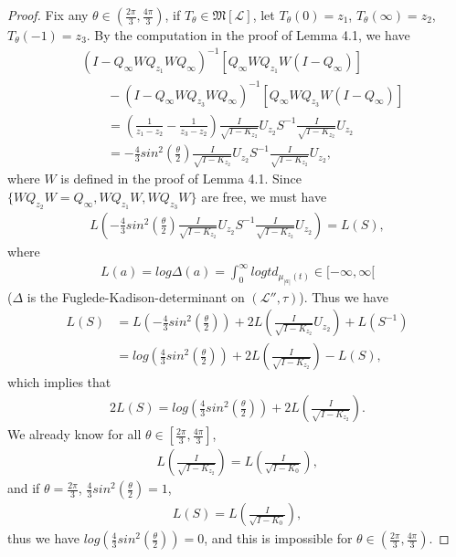 \documentclass{amsart}
\newcommand{\LLL}{\mathcal L} %
\newcommand{\MMM}{\mathfrak M}
\begin{document}
\begin{proof}
Fix any $\theta \in (\frac{2\pi}{3}, \frac{4\pi}{3})$, if $T_{\theta} \in \MMM[\LLL]$, let $T_{\theta}(0) = z_1$,
$T_{\theta}(\infty) = z_2$, $T_{\theta}(-1) = z_3$. By the computation in the proof of Lemma 4.1, we have
\begin{align*}
&(I - Q_{\infty}WQ_{z_1}WQ_{\infty})^{-1}[Q_{\infty}WQ_{z_1}W(I-Q_{\infty})] \\
 & \qquad -(I - Q_{\infty}WQ_{z_3}WQ_{\infty})^{-1}[Q_{\infty}WQ_{z_3}W(I-Q_{\infty})] \\
 & \qquad = (\frac{1}{z_1 - z_2} - \frac{1}{z_3 - z_2})\frac{I}{\sqrt{I - K_{z_2}}}U_{z_2}S^{-1}\frac{I}{\sqrt{I - K_{z_2}}}U_{z_2}\\
 & \qquad = -\frac{4}{3}sin^{2}(\frac{\theta}{2})\frac{I}{\sqrt{I - K_{z_2}}}U_{z_2}S^{-1}\frac{I}{\sqrt{I - K_{z_2}}}U_{z_2},
\end{align*}
where $W$ is defined in the proof of Lemma 4.1.
Since $\{WQ_{z_2}W = Q_{\infty}, WQ_{z_1}W, WQ_{z_3}W \}$ are free, we must have
\begin{align*}
L(-\frac{4}{3}sin^{2}(\frac{\theta}{2})\frac{I}{\sqrt{I - K_{z_2}}}U_{z_2}S^{-1}\frac{I}{\sqrt{I - K_{z_2}}}U_{z_2}) = L(S),
\end{align*}
where
\begin{align*}
L(a) = log\Delta(a) = \int^{\infty}_{0} log t d_{\mu_{|a|}(t)} \in [-\infty, \infty[
\end{align*}
($\Delta$ is the Fuglede-Kadison-determinant on $(\LLL'', \tau)$).
Thus we have
\begin{align*}
L(S) &= L(-\frac{4}{3}sin^{2}(\frac{\theta}{2})) + 2L(\frac{I}{\sqrt{I - K_{z_2}}}U_{z_2}) + L(S^{-1})\\
     &= log(\frac{4}{3}sin^{2}(\frac{\theta}{2})) + 2L(\frac{I}{\sqrt{I - K_{z_2}}}) - L(S),
\end{align*}
which implies that
\begin{align*}
2L(S) = log(\frac{4}{3}sin^{2}(\frac{\theta}{2})) + 2L(\frac{I}{\sqrt{I - K_{z_2}}}).
\end{align*}
We already know for all $\theta \in [\frac{2\pi}{3}, \frac{4\pi}{3}]$,
\begin{align*}
L(\frac{I}{\sqrt{I - K_{z_2}}}) = L(\frac{I}{\sqrt{I - K_{0}}}),
\end{align*}
and if $\theta = \frac{2\pi}{3}$, $\frac{4}{3}sin^{2}(\frac{\theta}{2}) = 1$,
\begin{align*}
L(S) = L(\frac{I}{\sqrt{I - K_{0}}}),
\end{align*}
thus we have $log(\frac{4}{3}sin^{2}(\frac{\theta}{2})) = 0$, and this is impossible for $\theta \in (\frac{2\pi}{3}, \frac{4\pi}{3})$.
\end{proof}
\end{document}
